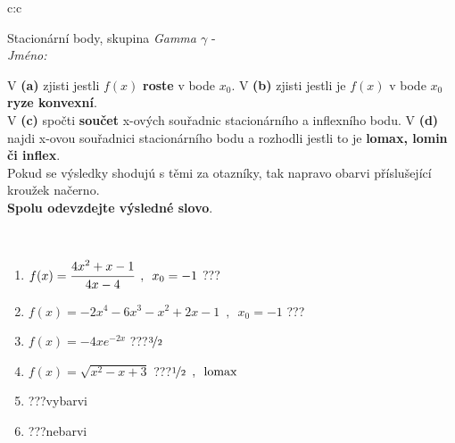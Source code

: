 \documentclass[10pt]{report}
\begin{document}
\newpage
\thispagestyle{empty}
\begin{tabular}{c:c}
\begin{minipage}[c][104.5mm][t]{0.5\linewidth}
\begin{center}
\vspace{7mm}
{\huge Stacionární body, skupina \textit{Gamma $\gamma$} -}\\[5mm]
\textit{Jméno:}\phantom{xxxxxxxxxxxxxxxxxxxxxxxxxxxxxxxxxxxxxxxxxxxxxxxxxxxxxxxxxxxxxxxxx}\\[5mm]
\begin{minipage}{0.95\linewidth}
\begin{center}
{\small V \textbf{(a)} zjisti jestli $f(x)$ \textbf{roste} v bode $x_0$. V \textbf{(b)} zjisti jestli je $f(x)$ v bode $x_0$ \textbf{ryze konvexní}.\\V \textbf{(c)} spočti \textbf{součet} x-ových souřadnic stacionárního a inflexního bodu. V \textbf{(d)} najdi x-ovou souřadnici stacionárního bodu a rozhodli jestli to je \textbf{lomax, lomin či inflex}.\\Pokud se výsledky shodujú s těmi za otazníky, tak napravo obarvi příslušející kroužek načerno.\\\textbf{Spolu odevzdejte výsledné slovo}}.
\end{center}
\end{minipage}
\\[1mm]
\begin{minipage}{0.79\linewidth}
\begin{center}
\begin{varwidth}{\linewidth}
\begin{enumerate}
\normalsize
\item $f(x)=\cfrac{4x^2+x-1}{4x-4}\enspace , \enspace x_0=-1$\quad \dotfill\; ???\;\dotfill \quad {}
\item $f(x)=-2x^4-6x^3-x^2+2x-1\enspace , \enspace x_0=-1$\quad \dotfill\; ???\;\dotfill \quad {}
\item $f(x)=-4xe^{-2x}$\quad \dotfill\; ???\;\dotfill \quad $\nicefrac{3}{2}$
\item $f(x)=\sqrt{x^2-x+3}$\quad \dotfill\; ???\;\dotfill \quad $\nicefrac{1}{2}\enspace , \enspace\mathrm{lomax}$
\item \quad \dotfill\; ???\;\dotfill \quad vybarvi
\item \quad \dotfill\; ???\;\dotfill \quad nebarvi
\end{enumerate}
\end{varwidth}
\end{center}

\end{minipage}
\end{center}
\end{minipage}
\end{tabular}
\end{document}
